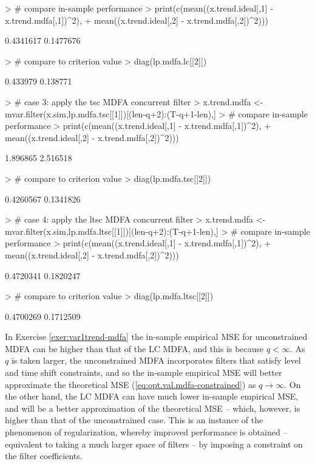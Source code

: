 \documentclass[a4paper]{book}
\def\tends{\rightarrow}
\begin{document}
\begin{Schunk}
\begin{Sinput}
> # compare in-sample performance
> print(c(mean((x.trend.ideal[,1] - x.trend.mdfa[,1])^2),
+ 	mean((x.trend.ideal[,2] - x.trend.mdfa[,2])^2)))
\end{Sinput}
\begin{Soutput}
[1] 0.4341617 0.1477676
\end{Soutput}
\begin{Sinput}
> # compare to criterion value
> diag(lp.mdfa.lc[[2]])
\end{Sinput}
\begin{Soutput}
[1] 0.433979 0.138771
\end{Soutput}
\begin{Sinput}
> # case 3: apply the tsc MDFA concurrent filter 
> x.trend.mdfa <- mvar.filter(x.sim,lp.mdfa.tsc[[1]])[(len-q+2):(T-q+1-len),]
> # compare in-sample performance
> print(c(mean((x.trend.ideal[,1] - x.trend.mdfa[,1])^2),
+ 	mean((x.trend.ideal[,2] - x.trend.mdfa[,2])^2)))
\end{Sinput}
\begin{Soutput}
[1] 1.896865 2.516518
\end{Soutput}
\begin{Sinput}
> # compare to criterion value
> diag(lp.mdfa.tsc[[2]])
\end{Sinput}
\begin{Soutput}
[1] 0.4260567 0.1341826
\end{Soutput}
\begin{Sinput}
> # case 4: apply the ltsc MDFA concurrent filter 
> x.trend.mdfa <- mvar.filter(x.sim,lp.mdfa.ltsc[[1]])[(len-q+2):(T-q+1-len),]
> # compare in-sample performance
> print(c(mean((x.trend.ideal[,1] - x.trend.mdfa[,1])^2),
+ 	mean((x.trend.ideal[,2] - x.trend.mdfa[,2])^2)))
\end{Sinput}
\begin{Soutput}
[1] 0.4720341 0.1820247
\end{Soutput}
\begin{Sinput}
> # compare to criterion value
> diag(lp.mdfa.ltsc[[2]])
\end{Sinput}
\begin{Soutput}
[1] 0.4700269 0.1712509
\end{Soutput}
\end{Schunk}
  
In Exercise \ref{exer:var1trend-mdfa} the in-sample empirical MSE for
 unconstrained MDFA can be higher than that of the LC MDFA, and this is
  because $q < \infty$.  As $q$ is taken larger, the unconstrained MDFA 
  incorporates filters that satisfy level and time shift constraints,
  and so the in-sample empirical MSE will better approximate the
  theoretical MSE (\ref{eq:opt.val.mdfa-constrained}) as $q \tends \infty$.  
  On the other hand,
  the LC MDFA can have much lower in-sample empirical MSE,  and will be
  a better approximation of the theoretical MSE -- which, however, is 
  higher than that of the unconstrained case.   This is an instance of
  the phenomenon of regularization, whereby improved performance is obtained --
  equivalent to taking a much larger space of filters -- by imposing a 
  constraint on the filter coefficients.
  
\end{document}
